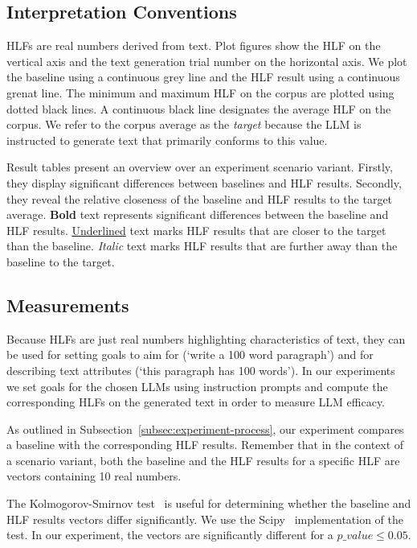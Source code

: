 \documentclass[a4paper,twoside]{article}
\begin{document}
\subsection{Interpretation Conventions}

HLFs are real numbers derived from text.
Plot figures show the HLF on the vertical axis and the text generation trial
number on the horizontal axis.
We plot the baseline using a continuous grey line and the HLF result using a
continuous grenat line.
The minimum and maximum HLF on the corpus are plotted using dotted black lines.
A continuous black line designates the average HLF on the corpus.
We refer to the corpus average as the \textit{target} because the LLM is
instructed to generate text that primarily conforms to this value.

Result tables present an overview over an experiment scenario variant.
Firstly, they display significant differences between baselines and HLF results.
Secondly, they reveal the relative closeness of the baseline and HLF results to
the target average.
\textbf{Bold} text represents significant differences between the baseline and
HLF results.
\underline{Underlined} text marks HLF results that are closer to the target than
the baseline.
\textit{Italic} text marks HLF results that are further away than the baseline
to the target.

\subsection{Measurements}\label{subsec:measurements}

Because HLFs are just real numbers highlighting characteristics of text, they
can be used for setting goals to aim for (`write a 100 word paragraph') and for
describing text attributes (`this paragraph has 100 words').
In our experiments we set goals for the chosen LLMs using instruction prompts
and compute the corresponding HLFs on the generated text in order to measure
LLM efficacy.

As outlined in Subsection~\ref{subsec:experiment-process}, our experiment
compares a baseline with the corresponding HLF results.
Remember that in the context of a scenario variant, both the baseline and the
HLF results for a specific HLF are vectors containing 10 real numbers.

The Kolmogorov-Smirnov test~\cite{kolmogorov1933,smirnov1939} is useful for
determining whether the baseline and HLF results vectors differ significantly.
We use the Scipy~\cite{2020SciPy-NMeth} implementation of the test.
In our experiment, the vectors are significantly different for a
$p\_value \le 0.05$.
\end{document}
